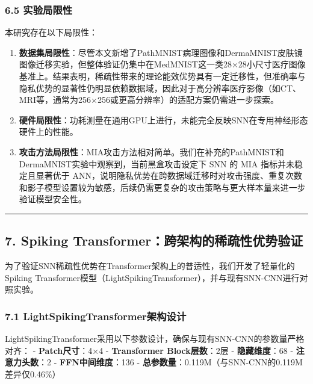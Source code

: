\documentclass[
]{article}
\begin{document}
\subsubsection{6.5 实验局限性}\label{ux5b9eux9a8cux5c40ux9650ux6027}

本研究存在以下局限性：

\begin{enumerate}
\def\labelenumi{\arabic{enumi}.}
\item
  \textbf{数据集局限性}：尽管本文新增了PathMNIST病理图像和DermaMNIST皮肤镜图像迁移实验，但整体验证仍集中在MedMNIST这一类28×28小尺寸医疗图像基准上。结果表明，稀疏性带来的理论能效优势具有一定迁移性，但准确率与隐私优势的显著性仍明显依赖数据域，因此对于高分辨率医疗影像（如CT、MRI等，通常为256×256或更高分辨率）的适配方案仍需进一步探索。
\item
  \textbf{硬件局限性}：功耗测量在通用GPU上进行，未能完全反映SNN在专用神经形态硬件上的性能。
\item
  \textbf{攻击方法局限性}：MIA攻击方法相对简单。我们在补充的PathMNIST和DermaMNIST实验中观察到，当前黑盒攻击设定下
  SNN 的 MIA 指标并未稳定且显著优于
  ANN，说明隐私优势在跨数据域迁移时对攻击强度、重复次数和影子模型设置较为敏感，后续仍需更复杂的攻击策略与更大样本量来进一步验证模型安全性。
\end{enumerate}

\begin{center}\rule{0.5\linewidth}{0.5pt}\end{center}

\subsection{7. Spiking
Transformer：跨架构的稀疏性优势验证}\label{spiking-transformerux8de8ux67b6ux6784ux7684ux7a00ux758fux6027ux4f18ux52bfux9a8cux8bc1}

为了验证SNN稀疏性优势在Transformer架构上的普适性，我们开发了轻量化的Spiking
Transformer模型（LightSpikingTransformer），并与现有SNN-CNN进行对照实验。

\subsubsection{7.1
LightSpikingTransformer架构设计}\label{lightspikingtransformerux67b6ux6784ux8bbeux8ba1}

LightSpikingTransformer采用以下参数设计，确保与现有SNN-CNN的参数量严格对齐：
- \textbf{Patch尺寸}：4×4 - \textbf{Transformer Block层数}：2层 -
\textbf{隐藏维度}：68 - \textbf{注意力头数}：2 -
\textbf{FFN中间维度}：136 -
\textbf{总参数量}：0.119M（与SNN-CNN的0.119M差异仅0.46\%）
\end{document}
